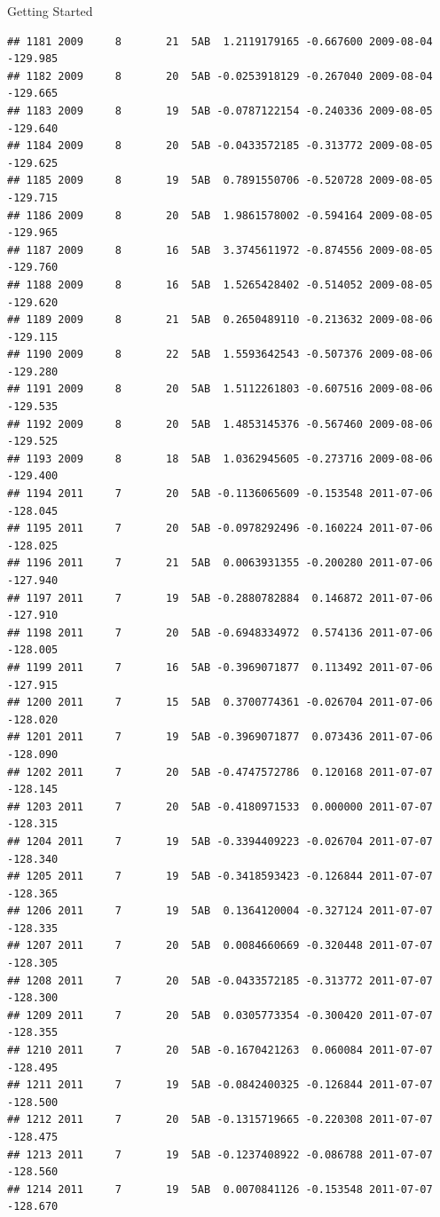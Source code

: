 \documentclass[
  ignorenonframetext,
]{beamer}
\begin{document}
\begin{frame}[fragile]{Getting Started}
\begin{verbatim}
## 1181 2009     8       21  5AB  1.2119179165 -0.667600 2009-08-04 -129.985
## 1182 2009     8       20  5AB -0.0253918129 -0.267040 2009-08-04 -129.665
## 1183 2009     8       19  5AB -0.0787122154 -0.240336 2009-08-05 -129.640
## 1184 2009     8       20  5AB -0.0433572185 -0.313772 2009-08-05 -129.625
## 1185 2009     8       19  5AB  0.7891550706 -0.520728 2009-08-05 -129.715
## 1186 2009     8       20  5AB  1.9861578002 -0.594164 2009-08-05 -129.965
## 1187 2009     8       16  5AB  3.3745611972 -0.874556 2009-08-05 -129.760
## 1188 2009     8       16  5AB  1.5265428402 -0.514052 2009-08-05 -129.620
## 1189 2009     8       21  5AB  0.2650489110 -0.213632 2009-08-06 -129.115
## 1190 2009     8       22  5AB  1.5593642543 -0.507376 2009-08-06 -129.280
## 1191 2009     8       20  5AB  1.5112261803 -0.607516 2009-08-06 -129.535
## 1192 2009     8       20  5AB  1.4853145376 -0.567460 2009-08-06 -129.525
## 1193 2009     8       18  5AB  1.0362945605 -0.273716 2009-08-06 -129.400
## 1194 2011     7       20  5AB -0.1136065609 -0.153548 2011-07-06 -128.045
## 1195 2011     7       20  5AB -0.0978292496 -0.160224 2011-07-06 -128.025
## 1196 2011     7       21  5AB  0.0063931355 -0.200280 2011-07-06 -127.940
## 1197 2011     7       19  5AB -0.2880782884  0.146872 2011-07-06 -127.910
## 1198 2011     7       20  5AB -0.6948334972  0.574136 2011-07-06 -128.005
## 1199 2011     7       16  5AB -0.3969071877  0.113492 2011-07-06 -127.915
## 1200 2011     7       15  5AB  0.3700774361 -0.026704 2011-07-06 -128.020
## 1201 2011     7       19  5AB -0.3969071877  0.073436 2011-07-06 -128.090
## 1202 2011     7       20  5AB -0.4747572786  0.120168 2011-07-07 -128.145
## 1203 2011     7       20  5AB -0.4180971533  0.000000 2011-07-07 -128.315
## 1204 2011     7       19  5AB -0.3394409223 -0.026704 2011-07-07 -128.340
## 1205 2011     7       19  5AB -0.3418593423 -0.126844 2011-07-07 -128.365
## 1206 2011     7       19  5AB  0.1364120004 -0.327124 2011-07-07 -128.335
## 1207 2011     7       20  5AB  0.0084660669 -0.320448 2011-07-07 -128.305
## 1208 2011     7       20  5AB -0.0433572185 -0.313772 2011-07-07 -128.300
## 1209 2011     7       20  5AB  0.0305773354 -0.300420 2011-07-07 -128.355
## 1210 2011     7       20  5AB -0.1670421263  0.060084 2011-07-07 -128.495
## 1211 2011     7       19  5AB -0.0842400325 -0.126844 2011-07-07 -128.500
## 1212 2011     7       20  5AB -0.1315719665 -0.220308 2011-07-07 -128.475
## 1213 2011     7       19  5AB -0.1237408922 -0.086788 2011-07-07 -128.560
## 1214 2011     7       19  5AB  0.0070841126 -0.153548 2011-07-07 -128.670

\end{verbatim}
\end{frame}
\end{document}
